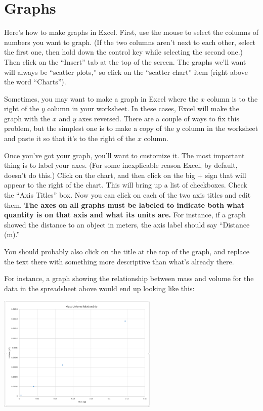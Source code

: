 {\par\centering {} \par}


\section{Graphs}

Here's how to make graphs in Excel.  First, use the mouse
to select the columns of numbers you want to graph.  (If the two
columns aren't next to each other, select the first one, then hold
down the control key while selecting the second one.)
Then click on the ``Insert'' tab at the top of the screen. The
graphs we'll want will always be ``scatter plots,'' 
so click on the ``scatter chart'' item (right above the word ``Charts'').

Sometimes, you may want to make a graph in Excel where the $x$ column
is to the right of the $y$ column in your worksheet.  In these cases,
Excel will make the graph with the $x$ and $y$ axes reversed.  There
are a couple of ways to fix this problem, but the simplest one is to make
a copy of the $y$ column in the worksheet and paste it so that it's
to the right of the $x$ column. 

Once you've got your graph, you'll
want to customize it. The most important thing is to label your axes.
(For some inexplicable reason Excel, by default, doesn't do this.)
Click on the chart, and then click on the big $+$ sign
that will appear to the right of the chart. This will bring
up a list of checkboxes. Check the ``Axis Titles'' box.
Now you can click on each of the two axis titles and edit them.
\textbf{The axes on all graphs must be labeled to indicate both
what quantity is on that axis and what its units are.} For instance,
if a graph showed the distance to an object in meters, the
axis label should say ``Distance (m).''

You should probably also click on the title at the top of the graph,
and replace the text there with something more descriptive than
what's already there. 

For instance, a graph showing the relationship between mass and volume
for the data in the spreadsheet above would end up looking like this:

\centerline{\includegraphics[width=3in]{figs/excel-graph.eps}}


